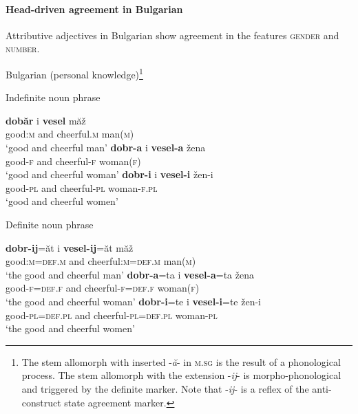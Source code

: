 \paragraph*{Head\hyp{}driven agreement in Bulgarian}
Attributive adjectives in Bulgarian show agreement in the features \textsc{gender} and \textsc{number}.
\begin{exe}
\ex \rm{Bulgarian (personal knowledge)}\footnote{The stem allomorph with inserted -\textit{ă}- in \textsc{m.sg} is the result of a phonological process. The stem allomorph with the extension -\textit{ij}- is morpho-phonological and triggered by the definite marker. Note that -\textit{ij}- is a reflex of the  anti\hyp{}construct state agreement marker.}
\begin{xlist}
\ex \rm{Indefinite noun phrase}
\begin{xlist}
\ex
\gll	\textbf{dobăr} i \textbf{vesel} măž\\
	good:\textsc{m} and cheerful.\textsc{m} man(\textsc{m})\\
\glt	‘good and cheerful man’
\ex
\gll	\textbf{dobr-a} i \textbf{vesel-a} žena\\
	good-\textsc{f} and cheerful-\textsc{f} woman(\textsc{f})\\
\glt	‘good and cheerful woman’
\ex
\gll	\textbf{dobr-i} i \textbf{vesel-i} žen-i\\
	good-\textsc{pl} and cheerful-\textsc{pl} woman-\textsc{f.pl}\\
\glt	‘good and cheerful women’
\end{xlist}
\ex \rm{Definite noun phrase}
\begin{xlist}
\ex
\gll	\textbf{dobr-ij}=ăt i \textbf{vesel-ij}=ăt măž\\
	good:\textsc{m}=\textsc{def.m} and cheerful:\textsc{m}=\textsc{def.m} man(\textsc{m})\\
\glt	‘the good and cheerful man’
\ex
\gll	\textbf{dobr-a}=ta i \textbf{vesel-a}=ta žena\\
	good-\textsc{f}=\textsc{def.f} and cheerful-\textsc{f}=\textsc{def.f} woman(\textsc{f})\\
\glt	‘the good and cheerful woman’
\ex
\gll	\textbf{dobr-i}=te i \textbf{vesel-i}=te žen-i\\
	good-\textsc{pl}=\textsc{def.pl} and cheerful-\textsc{pl}=\textsc{def.pl} woman-\textsc{pl}\\
\glt	‘the good and cheerful women’
\end{xlist}
\end{xlist}
\end{exe}

